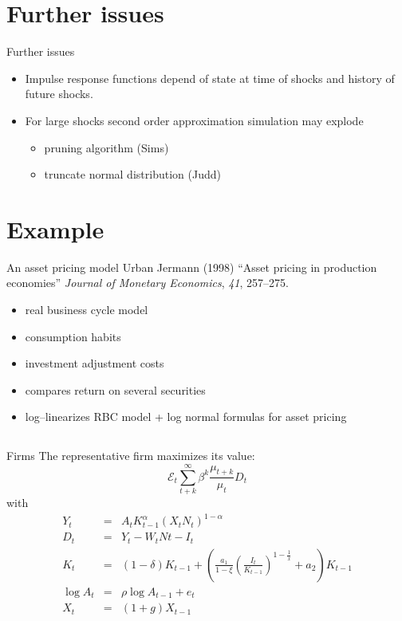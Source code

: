 \documentclass{beamer}
\begin{document}
\section[Further issues]{Further issues}
\begin{slide}{Further issues}
  \begin{itemize}
  \item Impulse response functions depend of state at time of shocks and history of future shocks.
  \item For large shocks second order approximation simulation may explode
    \begin{itemize}
    \item pruning algorithm (Sims)
    \item truncate normal distribution (Judd)
    \end{itemize}
  \end{itemize}
\end{slide}

\section[Example]{Example}
\begin{slide}{An asset pricing model}
Urban Jermann (1998) ``Asset pricing in production economies'' \emph{Journal of Monetary Economics}, \emph{41}, 257--275.

\begin{itemize}
\item real business cycle model
\item consumption habits
\item investment adjustment costs
\item compares return on several securities
\item log--linearizes RBC model + log normal formulas for asset pricing
\end{itemize}
\end{slide}

\subsection[]{}

\begin{slide}{Firms}
{\small
The representative firm maximizes its value:
\[
{\mathcal E}_t\sum_{t+k}^\infty \beta^k\frac{\mu_{t+k}}{\mu_t}D_t
\]
with
\begin{eqnarray*}
  Y_t &=& A_tK_{t-1}^\alpha\left(X_tN_t\right)^{1-\alpha}\\
D_t &=& Y_t - W_tNt-I_t\\
K_t &=& (1-\delta)K_{t-1}+\left(\frac{a_1}{1-\xi}\left(\frac{I_t}{K_{t-1}}\right)^{1-\frac{1}{x}}+a_2\right)K_{t-1}\\
\log A_t &=& \rho \log A_{t-1}+e_t\\
X_t &=& (1+g)X_{t-1}
\end{eqnarray*}
}
\end{slide}
\end{document}
